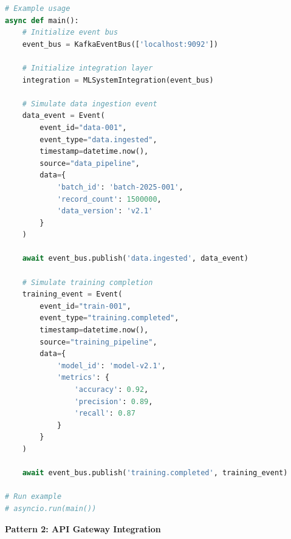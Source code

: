 \begin{lstlisting}[language=Python, caption=Event-Driven ML System Integration]
# Example usage
async def main():
    # Initialize event bus
    event_bus = KafkaEventBus(['localhost:9092'])

    # Initialize integration layer
    integration = MLSystemIntegration(event_bus)

    # Simulate data ingestion event
    data_event = Event(
        event_id="data-001",
        event_type="data.ingested",
        timestamp=datetime.now(),
        source="data_pipeline",
        data={
            'batch_id': 'batch-2025-001',
            'record_count': 1500000,
            'data_version': 'v2.1'
        }
    )

    await event_bus.publish('data.ingested', data_event)

    # Simulate training completion
    training_event = Event(
        event_id="train-001",
        event_type="training.completed",
        timestamp=datetime.now(),
        source="training_pipeline",
        data={
            'model_id': 'model-v2.1',
            'metrics': {
                'accuracy': 0.92,
                'precision': 0.89,
                'recall': 0.87
            }
        }
    )

    await event_bus.publish('training.completed', training_event)

# Run example
# asyncio.run(main())
\end{lstlisting}

\textbf{Pattern 2: API Gateway Integration}

